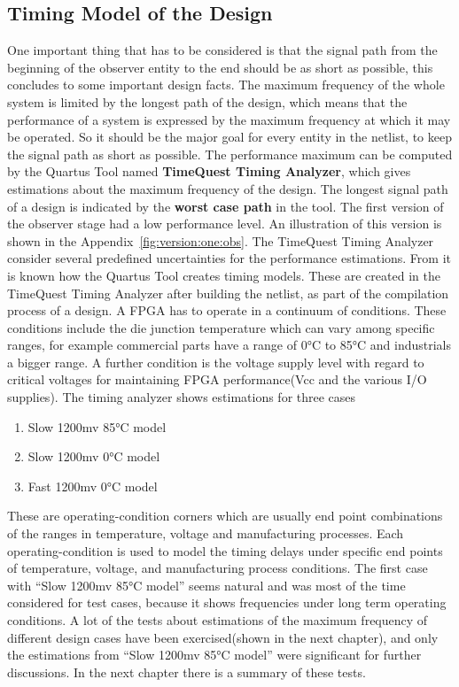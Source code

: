 \subsection{Timing Model of the Design}
\label{chapter:3:section:2:sub:2}
One important thing that has to be considered is that the signal path from the beginning of the observer entity to the end should be as short as possible,  
this concludes to some important design facts.
The maximum frequency of the whole system is limited by the longest path of the design, 
which means that the performance of a system is expressed by the maximum frequency at which it may be operated. 
So it should be the major goal for every entity in the netlist, to keep the signal path as short as possible. 
The performance maximum can be computed by the Quartus Tool named \textbf{TimeQuest Timing Analyzer}, which gives estimations about the maximum frequency of the design. 
The longest signal path of a design is indicated by the \textbf{worst case path} in the tool. \newline
The first version of the observer stage had a low performance level. 
An illustration of this version is shown in the Appendix~\ref{fig:version:one:obs}. 
The TimeQuest Timing Analyzer consider several predefined uncertainties for the performance estimations. 
From \cite{altera2} it is known how the Quartus Tool creates timing models. 
These are created in the TimeQuest Timing Analyzer after building the netlist, as part of the compilation process of a design. 
A FPGA has to operate in a continuum of conditions. These conditions include the die junction temperature which can vary among specific ranges, for example 
commercial parts have a range of 0°C to 85°C and industrials a bigger range. 
A further condition is the voltage supply level with regard to critical voltages for maintaining FPGA performance(Vcc and the various I/O supplies). 
\newline
The timing analyzer shows estimations for three cases
\begin{enumerate}
\item Slow 1200mv 85°C model
\item Slow 1200mv 0°C model
\item Fast 1200mv 0°C model
\end{enumerate}

These are operating-condition corners which are usually end point combinations of the ranges in temperature, voltage and manufacturing processes. 
Each operating-condition is used to model the timing delays under specific end points of temperature, voltage, and manufacturing process conditions. 
The first case with ``Slow 1200mv 85°C model'' seems natural and was most of the time considered for test cases, 
because it shows frequencies under long term operating conditions. 
A lot of the tests about estimations of the maximum frequency of different design cases have been exercised(shown in the next chapter), and only the estimations
from ``Slow 1200mv 85°C model'' were significant for further discussions. In the next chapter there is a summary of these tests. 

